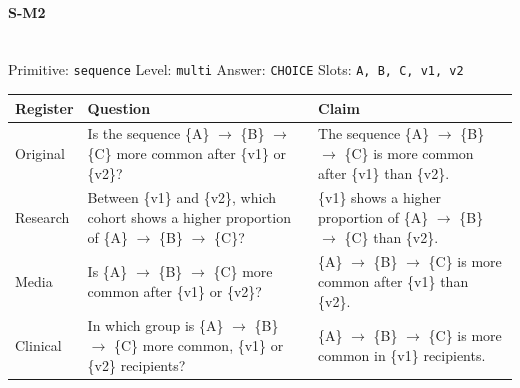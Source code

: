 \documentclass[11pt]{article}
\begin{document}
\paragraph{\textbf{S-M2}}\mbox{}\\
Primitive: \texttt{sequence} \quad Level: \texttt{multi} \quad Answer: \texttt{CHOICE} \quad Slots: \texttt{A, B, C, v1, v2}\\[2pt]
\begin{tabularx}{\linewidth}{@{}l L L@{}}
\toprule
\textbf{Register} & \textbf{Question} & \textbf{Claim} \\
\midrule
Original & Is the sequence \{A\} $\rightarrow$  \{B\} $\rightarrow$  \{C\} more common after \{v1\} or \{v2\}? & The sequence \{A\} $\rightarrow$  \{B\} $\rightarrow$  \{C\} is more common after \{v1\} than \{v2\}. \\
Research & Between \{v1\} and \{v2\}, which cohort shows a higher proportion of \{A\} $\rightarrow$  \{B\} $\rightarrow$  \{C\}? & \{v1\} shows a higher proportion of \{A\} $\rightarrow$  \{B\} $\rightarrow$  \{C\} than \{v2\}. \\
Media & Is \{A\} $\rightarrow$  \{B\} $\rightarrow$  \{C\} more common after \{v1\} or \{v2\}? & \{A\} $\rightarrow$  \{B\} $\rightarrow$  \{C\} is more common after \{v1\} than \{v2\}. \\
Clinical & In which group is \{A\} $\rightarrow$  \{B\} $\rightarrow$  \{C\} more common, \{v1\} or \{v2\} recipients? & \{A\} $\rightarrow$  \{B\} $\rightarrow$  \{C\} is more common in \{v1\} recipients. \\
\bottomrule
\end{tabularx}
\vspace{4pt}
\end{document}
